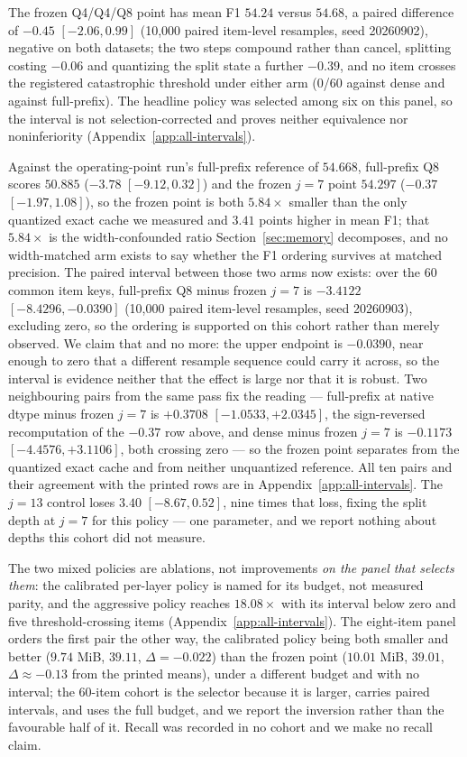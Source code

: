 \documentclass{article}
\begin{document}
The frozen Q4/Q4/Q8 point has mean F1 $54.24$ versus $54.68$, a paired
difference of $-0.45$ $[-2.06,0.99]$ (10,000 paired item-level resamples, seed
20260902), negative on both datasets; the two steps compound rather than cancel,
splitting costing $-0.06$ and quantizing the split state a further $-0.39$, and
no item crosses the registered catastrophic threshold under either arm (0/60
against dense and against full-prefix).  The headline policy was selected among
six on this panel, so the interval is not selection-corrected and proves neither
equivalence nor noninferiority (Appendix~\ref{app:all-intervals}).

Against the operating-point run's full-prefix reference of $54.668$,
full-prefix Q8 scores $50.885$ ($-3.78$ $[-9.12,0.32]$) and the frozen $j=7$
point $54.297$ ($-0.37$ $[-1.97,1.08]$), so the frozen point is both
$5.84\times$ smaller than the only quantized exact cache we measured and
$3.41$ points higher in mean F1; that $5.84\times$ is the width-confounded
ratio Section~\ref{sec:memory} decomposes, and no width-matched arm exists to
say whether the F1 ordering survives at matched precision. The paired interval
between those two arms now exists: over the 60 common item keys, full-prefix
Q8 minus frozen $j=7$ is $-3.4122$ $[-8.4296,-0.0390]$ (10,000 paired
item-level resamples, seed 20260903), excluding zero, so the ordering is
supported on this cohort rather than merely observed. We claim that and no
more: the upper endpoint is $-0.0390$, near enough to zero that a different
resample sequence could carry it across, so the interval is evidence neither
that the effect is large nor that it is robust. Two neighbouring pairs from
the same pass fix the reading --- full-prefix at native dtype minus frozen
$j=7$ is $+0.3708$ $[-1.0533,+2.0345]$, the sign-reversed recomputation of the
$-0.37$ row above, and dense minus frozen $j=7$ is $-0.1173$
$[-4.4576,+3.1106]$, both crossing zero --- so the frozen point separates from
the quantized exact cache and from neither unquantized reference. All ten
pairs and their agreement with the printed rows are in
Appendix~\ref{app:all-intervals}. The $j=13$ control loses $3.40$
$[-8.67,0.52]$, nine times that loss, fixing the split depth at $j=7$ for this
policy --- one parameter, and we report nothing about depths this cohort did
not measure.

The two mixed policies are ablations, not improvements \emph{on the panel that
selects them}: the calibrated per-layer policy is named for its budget, not
measured parity, and the aggressive policy reaches $18.08\times$ with its
interval below zero and five threshold-crossing items
(Appendix~\ref{app:all-intervals}).  The eight-item panel orders the first pair
the other way, the calibrated policy being both smaller and better ($9.74$ MiB,
$39.11$, $\Delta=-0.022$) than the frozen point ($10.01$ MiB, $39.01$,
$\Delta\approx-0.13$ from the printed means), under a different budget and with no
interval; the 60-item cohort is the selector because it is larger, carries paired
intervals, and uses the full budget, and we report the inversion rather than the
favourable half of it.  Recall was recorded in no cohort and we make no recall
claim.
\end{document}
